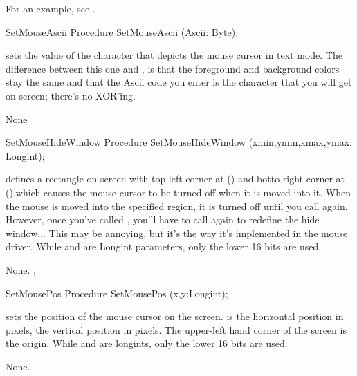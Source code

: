 For an example, see .
\begin{procedure}{SetMouseAscii}
\Declaration
Procedure SetMouseAscii (Ascii: Byte);

\Description

sets the  value of the character that depicts the mouse cursor in 
text mode.
The difference between this one and , is that the foreground
and background colors stay the same and that the Ascii code you enter is the
character that you will get on screen; there's no XOR'ing.

\Errors
None
\SeeAlso
{}
\end{procedure}
\html{}
\begin{procedure}{SetMouseHideWindow}
\Declaration
Procedure SetMouseHideWindow (xmin,ymin,xmax,ymax: Longint);

\Description

defines a rectangle on screen with top-left corner at () and
botto-right corner at (),which causes the mouse cursor to be 
turned off when it is moved into it.
When the mouse is moved into the specified region, it is turned off until you
call  again. However, once you've called , you'll have to
call  again to redefine the hide window... 
This may be annoying, but it's the way it's implemented in the mouse driver.
While  and  are Longint parameters, 
only the lower 16 bits are used.

\Errors
None.
\SeeAlso
{}, 
\end{procedure}
\html{}
\begin{procedure}{SetMousePos}
\Declaration
Procedure SetMousePos (x,y:Longint);

\Description

 sets the position of the mouse cursor on the screen.
 is the horizontal position in pixels,  the vertical position
in pixels. The upper-left hand corner of the screen is the origin.
While  and  are longints, only the lower 16 bits are used.

\Errors
None.
\SeeAlso
{}
\end{procedure}
\html{}
